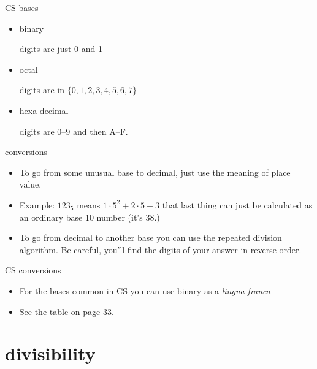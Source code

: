 \documentclass[landscape]{beamer}
\begin{document}
\begin{frame}{CS bases}
\begin{itemize}
\item binary \pause

digits are just 0 and 1 \pause

\item octal \pause

digits are in $\{0, 1, 2, 3, 4, 5, 6, 7 \}$ \pause

\item hexa-decimal \pause

digits are 0--9 and then A--F.

\end{itemize}
\end{frame}

\begin{frame}{conversions}
\begin{itemize}
\item To go from some unusual base to decimal, just use the meaning of place value. \pause
\item Example: $123_5$ means $1\cdot 5^2 + 2 \cdot 5 + 3$ \hspace{12pt} that last thing can just be calculated as an ordinary base 10 number (it's 38.) \pause
\item To go from decimal to another base you can use the repeated division algorithm. Be careful, you'll find the digits of your answer in reverse order. \pause 
\end{itemize}
\end{frame}

\begin{frame}{CS conversions}
\begin{itemize}
\item For the bases common in CS you can use binary as a {\em lingua franca} \pause
\item See the table on page 33.
\end{itemize}
\end{frame}

\section{divisibility}
\end{document}
